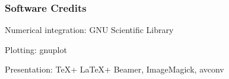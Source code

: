 \documentclass{beamer}
\begin{document}








\begin{frame}
\frametitle{Software Credits}

Numerical integration: GNU Scientific Library

Plotting: gnuplot

Presentation: \TeX + \LaTeX + Beamer, ImageMagick, avconv
\end{frame}
\end{document}
